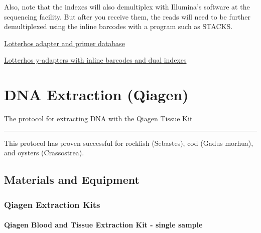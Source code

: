 \documentclass[
  letterpaper,
  DIV=11,
  numbers=noendperiod]{scrreprt}
\begin{document}
Also, note that the indexes will also demultiplex with Illumina's
software at the sequencing facility. But after you receive them, the
reads will need to be further demultiplexed using the inline barcodes
with a program such as STACKS.

\href{https://docs.google.com/spreadsheets/d/1bro9DbuJB9zH8KtIUH3H7FHrlVO2gZYbIsUbx7yax70/edit\#gid=0}{Lotterhos
adapter and primer database}

\href{https://docs.google.com/spreadsheets/d/1Ok9EEkloK6RCCpKsc4tjklF4UygO8SnATWK8HGLgpvY/edit\#gid=0}{Lotterhos
y-adapters with inline barcodes and dual indexes}

\hypertarget{dna-extraction-qiagen}{%
\chapter{DNA Extraction (Qiagen)}\label{dna-extraction-qiagen}}

The protocol for extracting DNA with the Qiagen Tissue Kit

\begin{center}\rule{0.5\linewidth}{0.5pt}\end{center}

This protocol has proven successful for rockfish (Sebastes), cod (Gadus
morhua), and oysters (Crassostrea).

\hypertarget{materials-and-equipment}{%
\section*{\texorpdfstring{\textbf{Materials and
Equipment}}{Materials and Equipment}}\label{materials-and-equipment}}

\hypertarget{qiagen-extraction-kits}{%
\subsection*{\texorpdfstring{\textbf{Qiagen Extraction
Kits}}{Qiagen Extraction Kits}}\label{qiagen-extraction-kits}}

\hypertarget{qiagen-blood-and-tissue-extraction-kit---single-sample}{%
\subsubsection*{\texorpdfstring{\textbf{Qiagen Blood and Tissue
Extraction Kit - single
sample}}{Qiagen Blood and Tissue Extraction Kit - single sample}}\label{qiagen-blood-and-tissue-extraction-kit---single-sample}}
\end{document}
